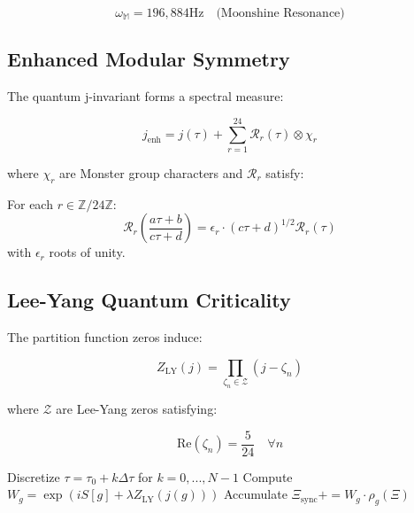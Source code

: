 \documentclass[12pt]{article}
\begin{document}
\begin{equation}
\omega_{\mathbb{M}} = 196,\!884 \text{Hz} \quad \text{(Moonshine Resonance)}
\end{equation}

\subsection{Enhanced Modular Symmetry}
The quantum j-invariant forms a spectral measure:

\begin{equation}
j_{\text{enh}} = j(\tau) + \sum_{r=1}^{24} \mathcal{R}_r(\tau) \otimes \chi_r
\end{equation}

where $\chi_r$ are Monster group characters and $\mathcal{R}_r$ satisfy:

\begin{theorem}
For each $r \in \mathbb{Z}/24\mathbb{Z}$:
\begin{equation}
\mathcal{R}_r\left(\frac{a\tau+b}{c\tau+d}\right) = \epsilon_r \cdot (c\tau+d)^{1/2} \mathcal{R}_r(\tau)
\end{equation}
with $\epsilon_r$ roots of unity.
\end{theorem}

\subsection{Lee-Yang Quantum Criticality}
The partition function zeros induce:

\begin{equation}
Z_{\text{LY}}(j) = \prod_{\zeta_n \in \mathcal{Z}} (j - \zeta_n)
\end{equation}

where $\mathcal{Z}$ are Lee-Yang zeros satisfying:

\begin{equation}
\text{Re}(\zeta_n) = \frac{5}{24} \quad \forall n
\end{equation}

\begin{algorithm}[H]
\caption{Monstrous Path Integral}
\begin{algorithmic}[1]
\STATE Discretize $\tau = \tau_0 + k\Delta\tau$ for $k=0,...,N-1$
\STATE Compute $W_g = \exp\left(iS[g] + \lambda Z_{\text{LY}}(j(g))\right)$
\STATE Accumulate $\Xi_{\text{sync}} += W_g \cdot \rho_g(\Xi)$
\ENDFOR
\end{algorithmic}
\end{algorithm}
\end{document}
